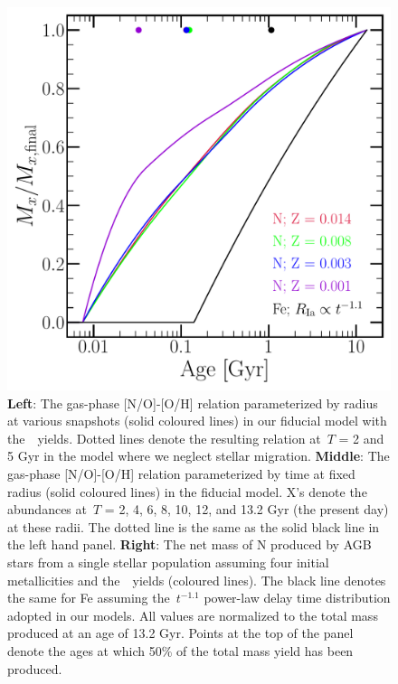 \documentclass[ms.tex]{subfiles}
\begin{document}
\begin{figure}
\includegraphics[scale = 0.3]{ssp_production.pdf} 
\caption{
\textbf{Left}: The gas-phase [N/O]-[O/H] relation parameterized by radius at 
various snapshots (solid coloured lines) in our fiducial model with 
the~\cristallo~yields. 
Dotted lines denote the resulting relation at~$T$ = 2 and 5 Gyr in the model 
where we neglect stellar migration. 
\textbf{Middle}: The gas-phase [N/O]-[O/H] relation parameterized by time at 
fixed radius (solid coloured lines) in the fiducial model. 
X's denote the abundances at~$T$ = 2, 4, 6, 8, 10, 12, and 13.2 Gyr (the 
present day) at these radii. 
The dotted line is the same as the solid black line in the left hand panel. 
\textbf{Right}: The net mass of N produced by AGB stars from a single stellar 
population assuming four initial metallicities and the~\cristallo~yields 
(coloured lines). 
The black line denotes the same for Fe assuming the~$t^{-1.1}$ power-law delay 
time distribution adopted in our models. 
All values are normalized to the total mass produced at an age of 13.2 Gyr. 
Points at the top of the panel denote the ages at which 50\% of the total mass 
yield has been produced. 
} 
\label{fig:no_oh_timeevol_ssp} 
\end{figure} 
\end{document}
